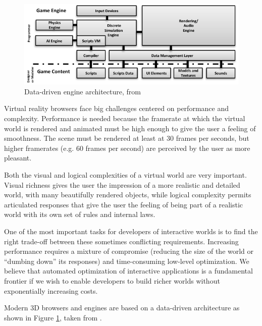

\begin{figure}
\begin{center}
\includegraphics[scale=0.8]{engine_architecture.pdf}
\end{center}
\label{fig:data_driven_games}
\caption{Data-driven engine architecture, from \cite{SGL}}
\end{figure}

Virtual reality browsers face big challenges centered on performance and complexity. Performance is needed because the framerate at which the virtual world is rendered and animated must be high enough to give the user a feeling of smoothness. The scene must be rendered at least at 30 frames per seconds, but higher framerates (e.g. 60 frames per second) are perceived by the user as more pleasant.

Both the visual and logical complexities of a virtual world are very important. Visual richness gives the user the impression of a more realistic and detailed world, with many beautifully rendered objects, while logical complexity permits articulated responses that give the user the feeling of being part of a realistic world with its own set of rules and internal laws.

One of the most important tasks for developers of interactive worlds is to find the right trade-off between these sometimes conflicting requirements. Increasing performance requires a mixture of compromise (reducing the size of the world or ``dumbing down'' its responses) and time-consuming low-level optimization. We believe that automated optimization of interactive applications is a fundamental frontier if we wish to enable developers to build richer worlds without exponentially increasing costs.

Modern 3D browsers and engines are based on a data-driven architecture as shown in Figure \ref{fig:data_driven_games}, taken from \cite{SGL}.

